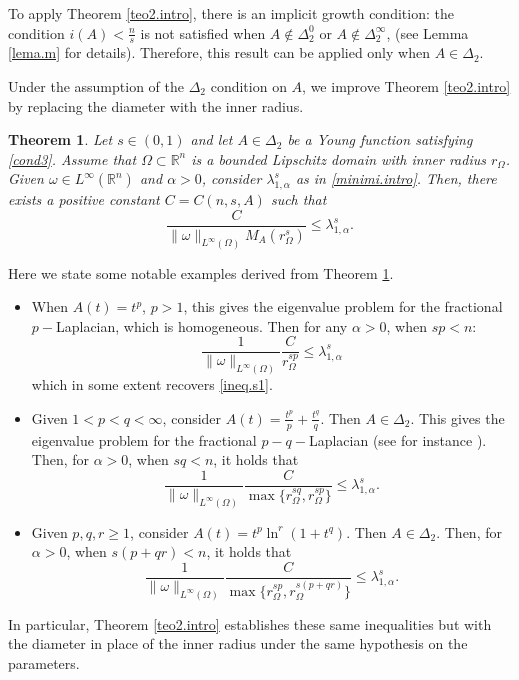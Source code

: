 \documentclass[12pt,reqno]{amsart}
\newtheorem{thm}{Theorem}[section]
\theoremstyle{definition}
\theoremstyle{remark}
\numberwithin{equation}{section}
\begin{document}
To apply Theorem \ref{teo2.intro}, there is an implicit growth condition: the condition $i(A)<\frac{n}{s}$ is not satisfied when   $A\not\in \Delta_2^0$ or $A\not \in \Delta_2^\infty$, (see Lemma \ref{lema.m} for details). Therefore, this result can be applied only when $A\in \Delta_2$.

Under the  assumption of the $\Delta_2$ condition on $A$, we improve Theorem \ref{teo2.intro} by replacing the diameter with the inner radius.

\begin{thm} \label{teo4.intro}
Let $s\in (0,1)$ and let $A\in \Delta_2$ be a Young function satisfying  \eqref{cond3}. Assume that $\Omega\subset \mathbb{R}^n$ is a bounded Lipschitz domain with inner radius $r_\Omega$.  Given  $\omega\in L^\infty(\mathbb{R}^n)$ and $\alpha>0$, consider  $\lambda_{1,\alpha}^s$ as in \eqref{minimi.intro}.  Then, there exists a positive constant $C=C(n,s,A)$  such that
$$
\frac{C}{  \|\omega\|_{L^\infty(\Omega)} M_A( r_\Omega^s) }\leq \lambda_{1,\alpha}^s.
$$
\end{thm}

\noindent Here we state some notable examples derived from Theorem \ref{teo4.intro}.  

\begin{itemize}
\item[i)] When $A(t)=t^p$, $p>1$, this gives the eigenvalue problem for the fractional $p-$Laplacian, which  is homogeneous. Then for any $\alpha>0$, when $sp<n$:
$$
\frac{1}{\|\omega\|_{L^\infty(\Omega)}}  \frac{C}{ r_\Omega^{sp}}\leq \lambda_{1,\alpha}^s
$$
which in some extent  recovers \eqref{ineq.s1}.

\medskip

\item[ii)]  Given $1<p<q<\infty$, consider $A(t)=\frac{t^p}{p} + \frac{t^q}{q}$. Then $A\in \Delta_2$. This gives the eigenvalue problem for the fractional $p-q-$Laplacian (see for instance \cite{ambrosio}). Then, for $\alpha>0$, when $sq<n$, it holds that
 $$
 \frac{1}{\|\omega\|_{L^\infty(\Omega)}} \frac{C}{ \max\{r_\Omega^{sq}, r_\Omega^{sp}\}}\leq \lambda_{1,\alpha}^s.
 $$
 
 \medskip
  
 \item[iii)] Given $p,q,r\geq 1$,  consider $A(t)=t^p \ln^r (1+t^q)$.  Then $A\in \Delta_2$. Then, for $\alpha>0$, when  $s(p+qr)<n$, it holds that
 $$
 \frac{1}{\|\omega\|_{L^\infty(\Omega)}} \frac{C}{ \max\{r_\Omega^{sp}, r_\Omega^{s(p+qr)}\}}\leq \lambda_{1,\alpha}^s.
 $$
 
 \end{itemize} 
In particular, Theorem \ref{teo2.intro} establishes these same inequalities but with the diameter in place of the inner radius under the same hypothesis on the parameters.
\end{document}
